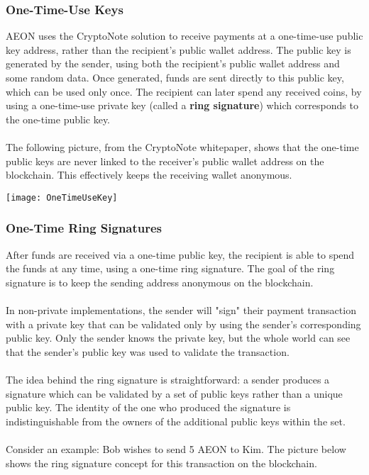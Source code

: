 \subsubsection{One-Time-Use Keys}
AEON uses the CryptoNote solution to receive payments at a one-time-use public key address, rather than the recipient's public wallet address.  The public key is generated by the sender, using both the recipient's public wallet address and some random data.  Once generated, funds are sent directly to this public key, which can be used only once.  The recipient can later spend any received coins, by using a one-time-use private key (called a \textbf{ring signature}) which corresponds to the one-time public key.\\
\\
The following picture, from the CryptoNote whitepaper, shows that the one-time public keys are never linked to the receiver's public wallet address on the blockchain.  This effectively keeps the receiving wallet anonymous.\\

\begin{center}
	\texttt{[image: OneTimeUseKey]}
\end{center}

\subsubsection{One-Time Ring Signatures}
After funds are received via a one-time public key, the recipient is able to spend the funds at any time, using a one-time ring signature.  The goal of the ring signature is to keep the sending address anonymous on the blockchain.\\
\\
In non-private implementations, the sender will "sign" their payment transaction with a private key that can be validated only by using the sender's corresponding public key.  Only the sender knows the private key, but the whole world can see that the sender's public key was used to validate the transaction.\\
\\
The idea behind the ring signature is straightforward:  a sender produces a signature which can be validated by a set of public keys rather than a unique public key.  The identity of the one who produced the signature is indistinguishable from the owners of the additional public keys within the set.\\
\\
Consider an example:  Bob wishes to send 5 AEON to Kim.  The picture below shows the ring signature concept for this transaction on the blockchain.\\

